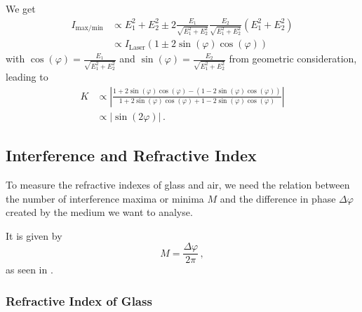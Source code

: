 We get
\begin{align*}
    I_{\text{max}/\text{min}} &\propto E^2_1 +E^2_2 \pm 2 \frac{E_1}{\sqrt{E^2_1 + E^2_2}} \frac{E_2}{\sqrt{E^2_1 + E^2_2}} (E^2_1+E^2_2) \\
    &\propto I_\text{Laser} (1 \pm 2 \sin(\varphi) \cos(\varphi))
\end{align*}
with $\cos(\varphi) = \frac{E_1}{\sqrt{E^2_1 + E^2_2}}$ and $\sin(\varphi) = \frac{E_2}{\sqrt{E^2_1 + E^2_2}}$ from geometric consideration,
leading to
\begin{align}
    K &\propto \left| \frac{1 + 2 \sin(\varphi) \cos(\varphi) - (1 - 2 \sin(\varphi) \cos(\varphi))}{1 + 2 \sin(\varphi) \cos(\varphi) + 1 - 2 \sin(\varphi) \cos(\varphi)}\right| \nonumber\\
      &\propto |\sin(2 \varphi)| \,.
      \label{eq:contrastprop}
\end{align}


\subsection{Interference and Refractive Index}
\label{subsec:intrefrac}

To measure the refractive indexes of glass and air, we need the relation between the number of interference maxima or minima $M$ and the difference in phase $\Delta\varphi$
created by the medium we want to analyse.

It is given by
\begin{equation}
    M = \frac{\Delta \varphi}{2 \pi}\,,
    \label{eq:intmax}
\end{equation} 
as seen in \cite{v64}.

\subsubsection{Refractive Index of Glass}

